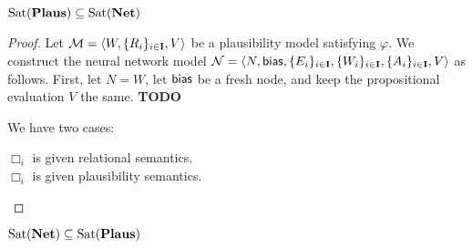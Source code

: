 \documentclass[letterpaper]{article}
\begin{document}
\begin{proposition}
    $\mathrm{Sat}( \textrm{\textbf{Plaus}} ) \subseteq \mathrm{Sat}( \textrm{\textbf{Net}} )$
\end{proposition}
\begin{proof}
    Let $\mathcal{M} = \langle W, \{ R_i \}_{i \in \textbf{I}}, V \rangle$ be a plausibility model satisfying $\varphi$.  We construct the neural network model $\mathcal{N} = \langle N, \mathsf{bias}, \{ E_i \}_{i \in \textbf{I}}, \{ W_i \}_{i \in \textbf{I}}, \{ A_i \}_{i \in \textbf{I}}, V \rangle$ as follows.  First, let $N = W$, let $\mathsf{bias}$ be a fresh node, and keep the propositional evaluation $V$ the same. \textbf{TODO}

    We have two cases:
    \begin{description}
        \item[$\Box_i$ is given relational semantics.] 
        
        \item[$\Box_i$ is given plausibility semantics.]  
    \end{description}
\end{proof}

\begin{proposition}
    $\mathrm{Sat}( \textrm{\textbf{Net}} ) \subseteq \mathrm{Sat}( \textrm{\textbf{Plaus}} )$
\end{proposition}



\end{document}
